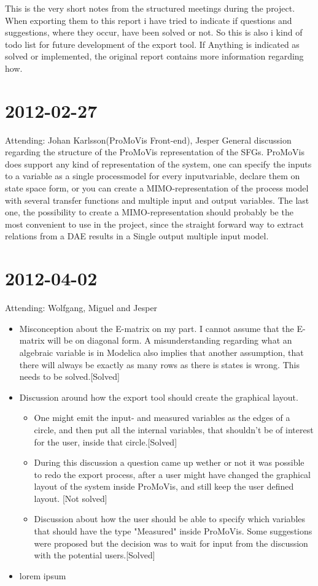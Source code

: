 This is the very short notes from the structured meetings during the project. When exporting them to this report i have tried to indicate if questions and suggestions, where they occur, have been solved or not. So this is also i kind of todo list for future development of the export tool. If Anything is indicated as solved or implemented, the original report contains more information regarding how.

\section{2012-02-27}
Attending: Johan Karlsson(ProMoVis Front-end), Jesper
General discussion regarding the structure of the ProMoVis representation of the SFGs. ProMoVis does support any kind of representation of the system, one can specify the inputs to a variable as a single processmodel for every inputvariable, declare them on state space form, or you can create a MIMO-representation of the process model with several transfer functions and multiple input and output variables. 
The last one, the possibility to create a MIMO-representation should probably be the most convenient to use in the project, since the straight forward way to extract relations from a DAE results in a Single output multiple input model.
\section{2012-04-02}
Attending: Wolfgang, Miguel and Jesper
\begin{itemize}
\item Misconception about the E-matrix on my part. I cannot assume that the E-matrix will be on diagonal form. A misunderstanding regarding what an algebraic variable is in Modelica also implies that another assumption, that there will always be exactly as many rows as there is states is wrong. This needs to be solved.[Solved]
\item Discussion around how the export tool should create the graphical layout. 
\begin{itemize}
\item One might emit the input- and measured variables as the edges of a circle, and then put all the internal variables, that shouldn't be of interest for the user, inside that circle.[Solved]
\item During this discussion a question came up wether or not it was possible to redo the export process, after a user might have changed the graphical layout of the system inside ProMoVis, and still keep the user defined layout. [Not solved]
\item Discussion about how the user should be able to specify which variables that should have the type "Measured" inside ProMoVis. Some suggestions were proposed but the decision was to wait for input from the discussion with the potential users.[Solved]
\end{itemize}
\item lorem ipsum
\end{itemize}


